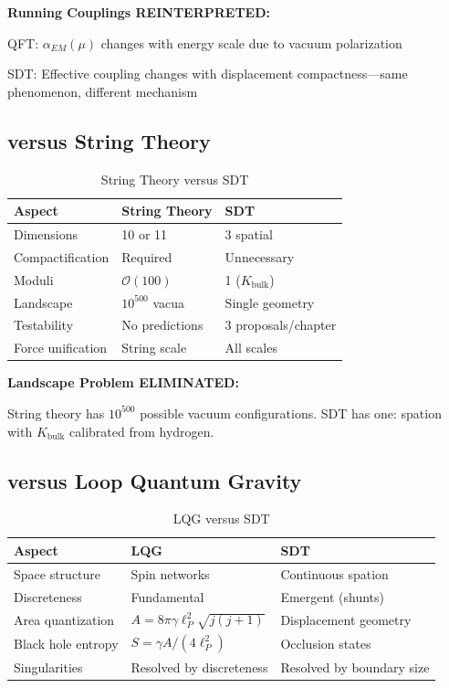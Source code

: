 \textbf{Running Couplings REINTERPRETED:}

QFT: $\alpha_{EM}(\mu)$ changes with energy scale due to vacuum polarization

SDT: Effective coupling changes with displacement compactness—same phenomenon, different mechanism

\subsection{versus String Theory}

\begin{table}[h]
\centering
\begin{tabular}{|l|l|l|}
\hline
\textbf{Aspect} & \textbf{String Theory} & \textbf{SDT} \\
\hline
Dimensions & 10 or 11 & 3 spatial \\
Compactification & Required & Unnecessary \\
Moduli & $\mathcal{O}(100)$ & 1 ($K_{\text{bulk}}$) \\
Landscape & $10^{500}$ vacua & Single geometry \\
Testability & No predictions & 3 proposals/chapter \\
Force unification & String scale & All scales \\
\hline
\end{tabular}
\caption{String Theory versus SDT}
\end{table}

\textbf{Landscape Problem ELIMINATED:}

String theory has $10^{500}$ possible vacuum configurations. SDT has one: spation with $K_{\text{bulk}}$ calibrated from hydrogen.

\subsection{versus Loop Quantum Gravity}

\begin{table}[h]
\centering
\begin{tabular}{|l|l|l|}
\hline
\textbf{Aspect} & \textbf{LQG} & \textbf{SDT} \\
\hline
Space structure & Spin networks & Continuous spation \\
Discreteness & Fundamental & Emergent (shunts) \\
Area quantization & $A = 8\pi \gamma \ell_P^2 \sqrt{j(j+1)}$ & Displacement geometry \\
Black hole entropy & $S = \gamma A/(4\ell_P^2)$ & Occlusion states \\
Singularities & Resolved by discreteness & Resolved by boundary size \\
\hline
\end{tabular}
\caption{LQG versus SDT}
\end{table}

